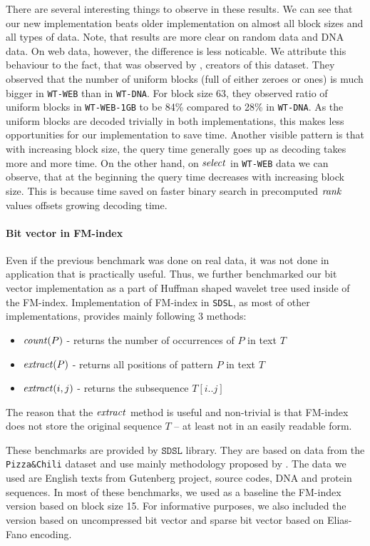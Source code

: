 There are several interesting things to observe in these results. We can see that our new implementation
beats older implementation on almost all block sizes and all types of data. Note, that results are more
clear on random data and DNA data. On web data, however, the difference is less noticable. We attribute
this behaviour to the fact, that was observed by \cite{gog2014optimized}, creators of this dataset. They
observed that the number of uniform blocks (full of either zeroes or ones) is much bigger in \texttt{WT-WEB}
than in \texttt{WT-DNA}. For block size 63, they observed ratio of uniform blocks in \texttt{WT-WEB-1GB}
to be 84\% compared to 28\% in \texttt{WT-DNA}. As the uniform blocks are decoded trivially in both
implementations, this makes less opportunities for our implementation to save time. Another visible pattern
is that with increasing block size, the query time generally goes up as decoding takes more and more time.
On the other hand, on $\mathit{select}$ in \texttt{WT-WEB} data we can observe, that at the beginning the query
time decreases with increasing block size. This is because time saved on faster binary search in precomputed
$\mathit{rank}$ values offsets growing decoding time.

\paragraph{Bit vector in FM-index}

Even if the previous benchmark was done on real data, it was not done in application that is
practically useful. Thus, we further benchmarked our bit vector implementation as a part
of Huffman shaped wavelet tree used inside of the FM-index. Implementation of FM-index in
\texttt{SDSL}, as most of other implementations, provides mainly following 3 methods:
\begin{itemize}
	\item $\mathit{count}(P)$ - returns the number of occurrences of $P$ in text $T$
	\item $\mathit{extract}(P)$ - returns all positions of pattern $P$ in text $T$
	\item $\mathit{extract}(i, j)$ - returns the subsequence $T[i..j]$
\end{itemize}
The reason that the $\mathit{extract}$ method is useful and non-trivial is that FM-index
does not store the original sequence $T$ -- at least not in an easily readable form.

These benchmarks are provided by $\texttt{SDSL}$ library. They are based on data from
the \texttt{Pizza\&Chili} dataset and use mainly methodology proposed by \cite{ferragina2009compressed}.
The data we used are English texts from Gutenberg project, source codes, DNA and protein
sequences. In most of these benchmarks, we used as a baseline the FM-index version based
on block size 15. For informative purposes, we also included the version based on uncompressed
bit vector and sparse bit vector based on Elias-Fano encoding.


